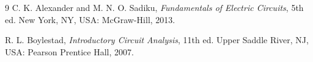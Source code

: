 \documentclass[12pt,a4paper]{article}
\begin{document}
\renewcommand{\refname}{\protect\large 1.9 Reference}
\begin{thebibliography}{9}
  C. K. Alexander and M. N. O. Sadiku, \emph{Fundamentals of Electric Circuits}, 5th ed. New York, NY, USA: McGraw-Hill, 2013.

  R. L. Boylestad, \emph{Introductory Circuit Analysis}, 11th ed. Upper Saddle River, NJ, USA: Pearson Prentice Hall, 2007.
\end{thebibliography}
\end{document}
